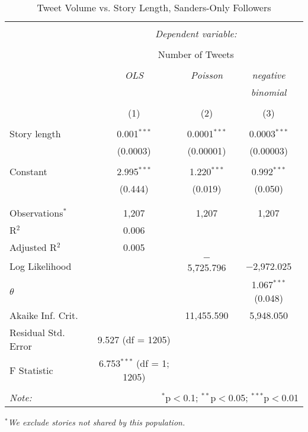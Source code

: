 \begin{table}[!htbp] \centering 
  \caption{Tweet Volume vs. Story Length, Sanders-Only Followers} 
  \label{} 
    \begin{tabular}{@{\extracolsep{5pt}}lccc} 
    \\[-1.8ex]\hline 
    \hline \\[-1.8ex] 
     & \multicolumn{3}{c}{\textit{Dependent variable:}} \\ 
    \cline{2-4} 
    \\[-1.8ex] & \multicolumn{3}{c}{Number of Tweets} \\ 
    \\[-1.8ex] & \textit{OLS} & \textit{Poisson} & \textit{negative} \\ 
     & \textit{} & \textit{} & \textit{binomial} \\ 
    \\[-1.8ex] & (1) & (2) & (3)\\ 
    \hline \\[-1.8ex] 
     Story length & 0.001$^{***}$ & 0.0001$^{***}$ & 0.0003$^{***}$ \\ 
      & (0.0003) & (0.00001) & (0.00003) \\ 
      & & & \\ 
     Constant & 2.995$^{***}$ & 1.220$^{***}$ & 0.992$^{***}$ \\ 
      & (0.444) & (0.019) & (0.050) \\ 
      & & & \\ 
    \hline \\[-1.8ex] 
    Observations$^{*}$ & 1,207 & 1,207 & 1,207 \\ 
    R$^{2}$ & 0.006 &  &  \\ 
    Adjusted R$^{2}$ & 0.005 &  &  \\ 
    Log Likelihood &  & $-$5,725.796 & $-$2,972.025 \\ 
    $\theta$ &  &  & 1.067$^{***}$  (0.048) \\ 
    Akaike Inf. Crit. &  & 11,455.590 & 5,948.050 \\ 
    Residual Std. Error & 9.527 (df = 1205) &  &  \\ 
    F Statistic & 6.753$^{***}$ (df = 1; 1205) &  &  \\ 
    \hline 
    \hline \\[-1.8ex] 
    \textit{Note:}  & \multicolumn{3}{r}{$^{*}$p$<$0.1; $^{**}$p$<$0.05; $^{***}$p$<$0.01} \\ 
    \end{tabular} 
\end{table} 
\emph{$^{*}$We exclude stories not shared by this population.} 
\newpage 

